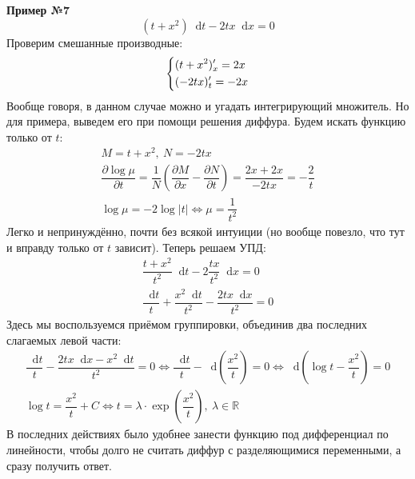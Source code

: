 \documentclass[a4paper,12pt]{article}
\newcommand{\R}{\mathbb{R}}
\renewcommand*\d{\mathop{}\!\mathrm{d}}
\begin{document}
\textbf{Пример №7}
\[(t + x^2)\d t - 2tx\d x = 0\]
Проверим смешанные производные:
\[\left\{\begin{gathered}
(t + x^2)'_x = 2x\hfill\\
(- 2tx)'_t = -2x\hfill
\end{gathered}\right.\]
Вообще говоря, в данном случае можно и угадать интегрирующий множитель. Но для примера, выведем его при помощи решения диффура. Будем искать функцию только от $t$:
\begin{gather*}
	M = t + x^2,\ N = -2tx\\
	\dfrac{\partial \log\mu}{\partial t} = \dfrac{1}{N}\left(\dfrac{\partial M}{\partial x} - \dfrac{\partial N}{\partial t}\right) = \dfrac{2x + 2x}{-2tx} = -\dfrac{2}{t}\\
	\log\mu = -2\log|t| \iff \mu = \dfrac{1}{t^2}
\end{gather*}
Легко и непринуждённо, почти без всякой интуиции (но вообще повезло, что тут и вправду только от $t$ зависит). Теперь решаем УПД:
\begin{gather*}
\dfrac{t + x^2}{t^2}\d t - 2\dfrac{tx}{t^2}\d x= 0 \\
\dfrac{\d t}{t} + \dfrac{x^2 \d t}{t^2} - \dfrac{2tx\d x}{t^2} = 0
\end{gather*}
Здесь мы воспользуемся приёмом группировки, объединив два последних слагаемых левой части:
\begin{gather*}
	\dfrac{\d t}{t} - \dfrac{2tx\d x - x^2\d t}{t^2} = 0 \iff \dfrac{\d t}{t} - \d\left(\dfrac{x^2}{t}\right) = 0 \iff \d\left(\log t - \dfrac{x^2}{t}\right) = 0\\
	\log t = \dfrac{x^2}{t} + C \iff t = \lambda \cdot \exp(\dfrac{x^2}{t}),\ \lambda \in \R
\end{gather*}
В последних действиях было удобнее занести функцию под дифференциал по линейности, чтобы долго не считать диффур с разделяющимися переменными, а сразу получить ответ.
\ \\
\end{document}
